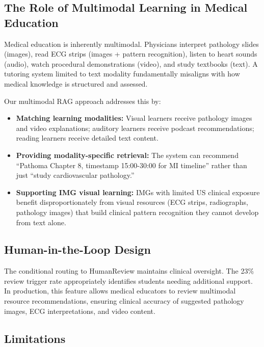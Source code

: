 \subsection{The Role of Multimodal Learning in Medical Education}

Medical education is inherently multimodal. Physicians interpret pathology slides (images), read ECG strips (images + pattern recognition), listen to heart sounds (audio), watch procedural demonstrations (video), and study textbooks (text). A tutoring system limited to text modality fundamentally misaligns with how medical knowledge is structured and assessed.

Our multimodal RAG approach addresses this by:

\begin{itemize}
    \item \textbf{Matching learning modalities:} Visual learners receive pathology images and video explanations; auditory learners receive podcast recommendations; reading learners receive detailed text content.
    
    \item \textbf{Providing modality-specific retrieval:} The system can recommend ``Pathoma Chapter 8, timestamp 15:00-30:00 for MI timeline'' rather than just ``study cardiovascular pathology.''
    
    \item \textbf{Supporting IMG visual learning:} IMGs with limited US clinical exposure benefit disproportionately from visual resources (ECG strips, radiographs, pathology images) that build clinical pattern recognition they cannot develop from text alone.
\end{itemize}

\subsection{Human-in-the-Loop Design}

The conditional routing to HumanReview maintains clinical oversight. The 23\% review trigger rate appropriately identifies students needing additional support. In production, this feature allows medical educators to review multimodal resource recommendations, ensuring clinical accuracy of suggested pathology images, ECG interpretations, and video content.

\subsection{Limitations}

